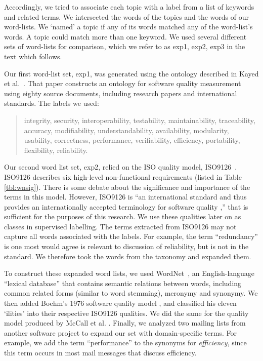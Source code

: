 \documentclass[]{sig-alternate}
\begin{document}
Accordingly, we tried to associate each topic with a label from a list of keywords and related terms. 
We intersected the words of the topics and the words of our word-lists.
We `named' a topic if any of its words matched any of the word-list's words.
A topic could match more than one keyword.
We used several different sets of word-lists for comparison, which we refer to as \textsf{exp1, exp2, exp3} in the text which follows. 

Our first word-list set, \textsf{exp1}, was generated using the ontology described in Kayed et al.~\cite{5072519}. 
That paper constructs an ontology for software quality measurement using eighty source documents, including research papers and international standards. 
The labels we used:
\begin{quotation}
\small \noindent \textsf{
integrity, security,
interoperability, testability, maintainability, traceability,
accuracy, modifiability, understandability, availability, modularity,
usability, correctness, performance, verifiability, efficiency,
portability, flexibility, reliability.
}
\end{quotation}

Our second word list set, \textsf{exp2}, relied on the ISO quality model, ISO9126~\cite{iso9126}. 
ISO9126 describes six high-level non-functional requirements (listed in Table \ref{tbl:wnsig}). 
There is some debate about the significance and importance of the terms in this model. 
However, ISO9126 is ``an international standard and thus provides an internationally accepted terminology for software quality \cite[p. 58]{Boegh2008},'' that is sufficient for the purposes of this research.  
We use these qualities later on as classes in supervised labelling.
The terms extracted from ISO9126 may not capture all words associated with the labels.  
For example, the term ``redundancy'' is one most would agree is relevant to discussion of reliability, but is not in the standard. 
We therefore took the words from the taxonomy and expanded them.

To construct these expanded word lists, we used WordNet~\cite{Fellbaum1998}, an English-language ``lexical database'' that contains semantic relations between words, including common related forms (similar to word stemming), meronymy and synonymy. 
We then added Boehm's 1976 software quality model \cite{Boehm+:1976:ICSE}, and classified his eleven `ilities' into their respective ISO9126 qualities. 
We did the same for the quality model produced by McCall et al. \cite{mccall1977}. 
Finally, we analyzed two mailing lists from another software project to expand our set with domain-specific terms. 
For example, we add the term ``performance'' to the synonyms for \emph{efficiency}, since this term occurs in most mail messages that discuss efficiency.
\end{document}
